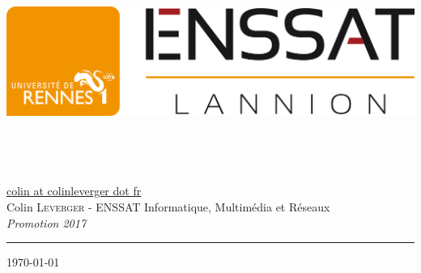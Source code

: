 \begin{titlepage}
  \begin{sffamily}
  \begin{center}

	\href{http://enssat.fr}{\includegraphics[scale=0.2]{images/logo_ecole.png}}\\[1.5cm]
      
    \textsc{\Large\quelrapport}\\[1.5cm]

    \HRule \\[1cm]
    { \titre\\[1cm] }
    \HRule \\[1.5cm]

    \large
        \href{mailto:colin@colinleverger.fre}{colin \lbrack{}at\rbrack{} colinleverger \lbrack{}dot\rbrack{} fr}\\[0.5cm]
        Colin \textsc{Leverger} -
        ENSSAT Informatique, Multimédia et Réseaux \\
        \emph{Promotion 2017}
        \skipduhaut        
    \rule{\linewidth}{0.2mm}        
    \dest
    \vfill

    \today

  \end{center}
  \end{sffamily}
\end{titlepage}